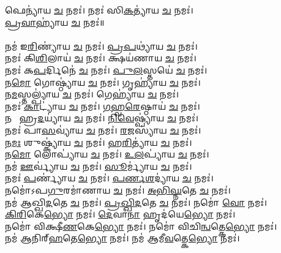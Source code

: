 𑌫𑍇𑌨𑍍𑌯𑌾॑𑌯 \ul{𑌚} 𑌨𑌮𑌃॑। 𑌨𑌮𑌃॑ 𑌸𑌿\ul{𑌕}𑌤𑍍𑌯𑌾॑𑌯 \ul{𑌚} 𑌨𑌮𑌃॑। \\
\ul{𑌪𑍍𑌰}\ul{𑌵𑌾}𑌹𑍍𑌯𑌾॑𑌯 \ul{𑌚} 𑌨𑌮𑌃॑॥ \\
\\
𑌨𑌮॑ 𑌇\ul{𑌰𑌿}𑌣𑍍𑌯𑌾॑𑌯 \ul{𑌚} 𑌨𑌮𑌃॑। \ul{𑌪𑍍𑌰}\ul{𑌪}𑌥𑍍𑌯𑌾॑𑌯 \ul{𑌚} 𑌨𑌮𑌃॑। \\
𑌨𑌮𑌃॑ 𑌕𑌿\ul{𑌶𑌿}𑌲𑌾𑌯॑ \ul{𑌚} 𑌨𑌮𑌃॑। 𑌕𑍍𑌷𑌯॑𑌣𑌾𑌯 \ul{𑌚} 𑌨𑌮𑌃॑। \\
𑌨𑌮𑌃॑ 𑌕\ul{𑌪}𑌰𑍍𑌦𑌿𑌨𑍇॑ \ul{𑌚} 𑌨𑌮𑌃॑। \ul{𑌪𑍁}\ul{𑌲}𑌸𑍍𑌤𑌯𑍇॑ \ul{𑌚} 𑌨𑌮𑌃॑।\\
𑌨\ul{𑌮𑍋} 𑌗𑍋𑌷𑍍𑌠𑍍𑌯𑌾॑𑌯 \ul{𑌚} 𑌨𑌮𑌃॑। 𑌗𑍃𑌹𑍍𑌯𑌾॑𑌯 \ul{𑌚} 𑌨𑌮𑌃॑। \\
𑌨\ul{𑌮}𑌸𑍍𑌤𑌲𑍍𑌪𑍍𑌯𑌾॑𑌯 \ul{𑌚} 𑌨𑌮𑌃॑। 𑌗𑍇𑌹𑍍𑌯𑌾॑𑌯 \ul{𑌚} 𑌨𑌮𑌃॑। \\
𑌨𑌮𑌃॑ \ul{𑌕𑌾}𑌟𑍍𑌯𑌾॑𑌯 \ul{𑌚} 𑌨𑌮𑌃॑। \ul{𑌗}\ul{𑌹𑍍𑌵}\ul{𑌰𑍇}𑌷𑍍𑌠𑌾𑌯॑ \ul{𑌚} 𑌨𑌮𑌃॑।\\
𑌨𑌮𑍋᳚ 𑌹𑍍𑌰\ul{𑌦}𑌯𑍍𑌯𑌾॑𑌯 \ul{𑌚} 𑌨𑌮𑌃॑। \ul{𑌨𑌿}\ul{𑌵𑍇}𑌷𑍍𑌪𑍍𑌯𑌾॑𑌯 \ul{𑌚} 𑌨𑌮𑌃॑। \\
𑌨𑌮𑌃॑ 𑌪𑌾\ul{𑌸}𑌵𑍍𑌯𑌾॑𑌯 \ul{𑌚} 𑌨𑌮𑌃॑। \ul{𑌰}\ul{𑌜}𑌸𑍍𑌯𑌾॑𑌯 \ul{𑌚} 𑌨𑌮𑌃॑।\\
𑌨\ul{𑌮𑌃} 𑌶𑍁𑌷𑍍𑌕𑍍𑌯𑌾॑𑌯 \ul{𑌚} 𑌨𑌮𑌃॑। \ul{𑌹}\ul{𑌰𑌿}𑌤𑍍𑌯𑌾॑𑌯 \ul{𑌚} 𑌨𑌮𑌃॑। \\
𑌨\ul{𑌮𑍋} 𑌲𑍋𑌪𑍍𑌯𑌾॑𑌯 \ul{𑌚} 𑌨𑌮𑌃॑। \ul{𑌉}\ul{𑌲}𑌪𑍍𑌯𑌾॑𑌯 \ul{𑌚} 𑌨𑌮𑌃॑। \\
𑌨𑌮॑ \ul{𑌊}𑌰𑍍𑌵𑍍𑌯𑌾॑𑌯 \ul{𑌚} 𑌨𑌮𑌃॑। \ul{𑌸𑍂}𑌰𑍍𑌮𑍍𑌯𑌾॑𑌯 \ul{𑌚} 𑌨𑌮𑌃॑। \\
𑌨𑌮𑌃॑ \ul{𑌪}𑌰𑍍𑌣𑍍𑌯𑌾॑𑌯 \ul{𑌚} 𑌨𑌮𑌃॑। \ul{𑌪}\ul{𑌰𑍍𑌣}\ul{𑌶}𑌦𑍍𑌯𑌾॑𑌯 \ul{𑌚} 𑌨𑌮𑌃॑। \\
𑌨𑌮𑍋॑𑌽𑌪\ul{𑌗𑍁}𑌰𑌮𑌾॑𑌣𑌾𑌯 \ul{𑌚} 𑌨𑌮𑌃॑। \ul{𑌅}\ul{𑌭𑌿}\ul{𑌘𑍍𑌨}𑌤𑍇 \ul{𑌚} 𑌨𑌮𑌃॑। \\
𑌨𑌮॑ 𑌆𑌖𑍍𑌖𑌿\ul{𑌦}𑌤𑍇 \ul{𑌚} 𑌨𑌮𑌃॑। \ul{𑌪𑍍𑌰}\ul{𑌖𑍍𑌖𑌿}\ul{𑌦}𑌤𑍇 \ul{𑌚} 𑌨𑌮𑌃॑। 𑌨𑌮𑍋॑ \ul{𑌵𑍋} 𑌨𑌮𑌃॑। \\
\ul{𑌕𑌿}\ul{𑌰𑌿}𑌕𑍇\ul{𑌭𑍍𑌯𑍋} 𑌨𑌮𑌃॑। \ul{𑌦𑍇}𑌵𑌾\ul{𑌨𑌾}\ul{} 𑌹𑍃𑌦॑𑌯𑍇\ul{𑌭𑍍𑌯𑍋} 𑌨𑌮𑌃॑। \\
𑌨𑌮𑍋॑ 𑌵𑌿𑌕𑍍𑌷𑍀\ul{𑌣}𑌕𑍇\ul{𑌭𑍍𑌯𑍋} 𑌨𑌮𑌃॑। 𑌨𑌮𑍋॑ 𑌵𑌿𑌚𑌿\ul{𑌨𑍍𑌵}𑌤𑍍𑌕𑍇\ul{𑌭𑍍𑌯𑍋} 𑌨𑌮𑌃॑। \\
𑌨𑌮॑ 𑌆𑌨𑌿𑌰𑍍‌\ul{𑌹}𑌤𑍇\ul{𑌭𑍍𑌯𑍋} 𑌨𑌮𑌃॑। 𑌨𑌮॑ 𑌆𑌮𑍀\ul{𑌵}𑌤𑍍𑌕𑍇\ul{𑌭𑍍𑌯𑍋} 𑌨𑌮𑌃॑। \\
{\small \closesection}



